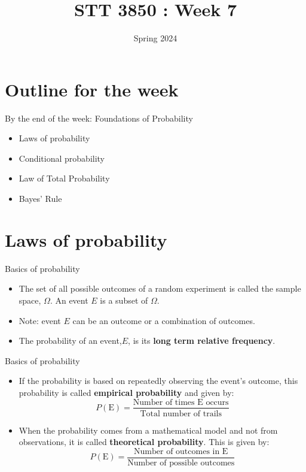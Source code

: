 \documentclass[
  ignorenonframetext,
]{beamer}
\title{STT 3850 : Week 7}
\author{Spring 2024}
\date{}
\institute{Appalachian State University}
\providecommand{\tightlist}{%
  \setlength{\itemsep}{0pt}\setlength{\parskip}{0pt}}
\begin{document}
\frame{\titlepage}

\hypertarget{outline-for-the-week}{%
\section{Outline for the week}\label{outline-for-the-week}}

\begin{frame}{By the end of the week: Foundations of Probability}
\protect\hypertarget{by-the-end-of-the-week-foundations-of-probability}{}
\begin{itemize}
\tightlist
\item
  Laws of probability
\item
  Conditional probability
\item
  Law of Total Probability
\item
  Bayes' Rule
\end{itemize}
\end{frame}

\hypertarget{laws-of-probability}{%
\section{Laws of probability}\label{laws-of-probability}}

\begin{frame}{Basics of probability}
\protect\hypertarget{basics-of-probability}{}
\begin{itemize}
\item
  The set of all possible outcomes of a random experiment is called the
  sample space, \(\Omega\). An event \(E\) is a subset of \(\Omega\).
\item
  Note: event \(E\) can be an outcome or a combination of outcomes.
\item
  The probability of an event,\(E\), is its \textbf{long term relative
  frequency}.
\end{itemize}
\end{frame}

\begin{frame}{Basics of probability}
\protect\hypertarget{basics-of-probability-1}{}
\begin{itemize}
\tightlist
\item
  If the probability is based on repeatedly observing the event's
  outcome, this probability is called \textbf{empirical probability} and
  given by:
  \[P(\text{E})=\frac{\text{Number of times E occurs}}{\text{Total number of trails}}\]
\item
  When the probability comes from a mathematical model and not from
  observations, it is called \textbf{theoretical probability}. This is
  given by:
  \[P(\text{E})=\frac{\text{Number of outcomes in E}}{\text{Number of possible outcomes}}\]
\end{itemize}
\end{frame}
\end{document}
